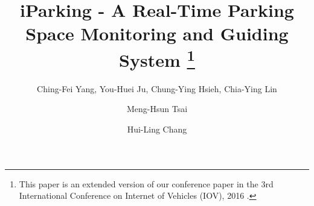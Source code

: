\documentclass[preprint,12pt]{elsarticle}
\begin{document}
\begin{frontmatter}



\title{iParking - A Real-Time Parking Space Monitoring and Guiding System
\thanks{This paper is an extended version of our conference paper in the 3rd
International Conference on Internet of Vehicles (IOV), 2016 \cite{IOV2016}.}}

\author{Ching-Fei Yang, You-Huei Ju, Chung-Ying Hsieh,
Chia-Ying Lin}
\author[corr]{Meng-Hsun Tsai}
\author{Hui-Ling Chang}


\address[corr]{Corresponding author. Email address: tsaimh@csie.ncku.edu.tw (M.-H. Tsai)}
\address{Department of Computer Science and Information Engineering, \\ National Cheng Kung University}
\address{No. 1 University Rd., Tainan 701, Taiwan, R.O.C.}


\end{frontmatter}
\end{document}
